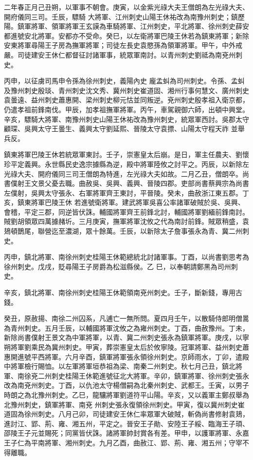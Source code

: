 \begin{pinyinscope}
 二年春正月己丑朔，以軍事不朝會。庚寅，以金紫光祿大夫王僧朗為左光祿大夫、開府儀同三司。壬辰，驃騎
 大將軍、江州刺史山陽王休祐改為南豫州刺史；鎮歷陽。鎮軍將軍、領軍將軍王玄謨為車騎將軍、江州刺史，平北將軍、徐州刺史薛安都進號安北將軍。安都亦不受命。癸巳，以左衛將軍巴陵王休若為鎮東將軍；新除安東將軍尋陽王子房為撫軍將軍；司徒左長史袁愍孫為領軍將軍。甲午，中外戒嚴。司徒建安王休仁都督征討諸軍事，統眾軍南討。以青州刺史劉祗為南兗州刺史。



 丙申，以征虜司馬申令孫為徐州刺史，義陽內史
 龐孟虯為司州刺史。令孫、孟虯及豫州刺史殷琰、青州刺史沈文秀、冀州刺史崔道固、湘州行事何慧文、廣州刺史袁曇遠、益州刺史蕭惠開、梁州刺史柳元怙並同叛逆。兗州刺史殷孝祖入衛京都，仍遣孝祖前鋒南伐。甲辰，加孝祖撫軍將軍。丙午，車駕親御六師，出頓中興堂。辛亥，驃騎大將軍、南豫州刺史山陽王休祐改為豫州刺史，統眾軍西討。吳郡太守顧琛、吳興太守王曇生、義興太守劉延熙、晉陵太守袁摽、山陽太守程天祚
 並舉兵反。



 鎮東將軍巴陵王休若統眾軍東討。壬子，崇憲皇太后崩。是日，軍主任農夫、劉懷珍平定義興。永世縣民史逸宗據縣為逆，殿中將軍陸攸之討平之。丙辰，以新除左光祿大夫、開府儀同三司王僧朗為特進，左光祿大夫如故。二月乙丑，僧朗卒。尚書僕射王文景父憂去職。曲赦吳、吳興、義興、晉陵四郡。吏部尚書蔡興宗為尚書左僕射，吳興太守張永、右軍將軍齊王東討，平晉陵。癸未，曲赦浙江東五郡。丁亥，鎮東將軍巴陵王休
 若進號衛將軍。建武將軍吳喜公率諸軍破賊於吳、吳興、會稽，平定三郡，同逆皆伏誅。輔國將軍齊王前鋒北討，輔國將軍劉緬前鋒南討。賊劉胡領眾四萬據赭圻。三月庚寅，撫軍將軍沈攸之代為南討前鋒。賊眾稍盛，袁鳷頓鵲尾，聯營迄至濃湖，眾十餘萬。壬辰，以新除太子詹事張永為青、冀二州刺史。



 丙申，鎮北將軍、南徐州刺史桂陽王休範總統北討諸軍事。丁酉，以尚書劉思考為徐州刺史。戊戌，貶尋陽王子房爵為松滋縣侯。乙
 巳，以奉朝請鄭黑為司州刺史。



 辛亥，鎮北將軍、南徐州刺史桂陽王休範領南兗州刺史。壬子，斷新錢，專用古錢。



 癸丑，原赦揚、南徐二州囚系，凡逋亡一無所問。夏四月壬午，以散騎侍郎明僧暠為青州刺史。五月壬辰，以輔國將軍沈攸之為雍州刺史。丁酉，曲赦豫州。丁未，新除尚書僕射王景文為中軍將軍，以青、冀二州刺史張永為鎮軍將軍。庚戌，以寧朔將軍劉乘民為冀州刺史。甲寅，葬崇憲皇太后於攸寧陵。冠軍將軍、益州刺史蕭
 惠開進號平西將軍。六月辛酉，鎮軍將軍張永領徐州刺史。京師雨水，丁卯，遣殿中將軍檢行賜恤。以左軍將軍垣恭祖為梁、南秦二州刺史。秋七月己丑，鎮北將軍、南徐兗二州刺史桂陽王休範進號征北大將軍。辛卯，鎮軍將軍、徐州刺史張永改為南兗州刺史。丁酉，以仇池太守楊僧嗣為北秦州刺史、武都王。壬寅，以男子時朗之為北豫州刺史。乙巳，龍驤將軍劉道符平山陽。辛亥，又以義軍主鄭叔舉為北豫州刺史，鎮軍將軍、南兗
 州刺史張永復領徐州刺史。甲寅，復以冀州刺史崔道固為徐州刺史。八月己卯，司徒建安王休仁率眾軍大破賊，斬偽尚書修射袁鳷，進討江、郢、荊、雍、湘五州，平定之。晉安王子勛、安陸王子綏、臨海王子頊、邵陵王子元並賜死；同黨皆伏誅。諸將軍帥封賞各有差。甲申，以護軍將軍、永嘉王子仁為平南將軍、湘州刺史。九月乙酉，曲赦江、郢、荊、雍、湘五州；守宰不得離職。




\end{pinyinscope}
